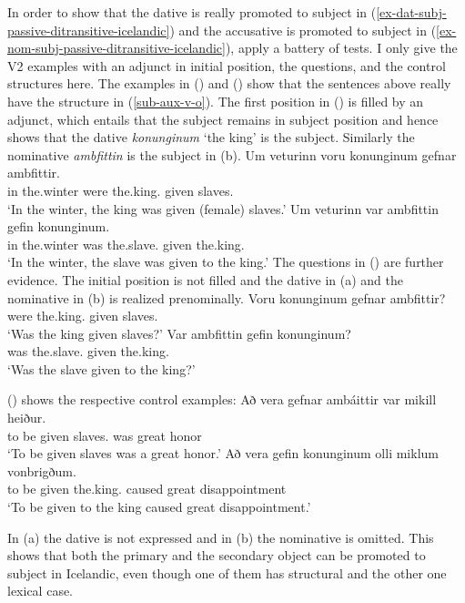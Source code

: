 In order to show that the dative is really promoted to subject in (\ref{ex-dat-subj-passive-ditransitive-icelandic}) and the accusative is
promoted to subject in (\ref{ex-nom-subj-passive-ditransitive-icelandic}), \citet*[]{ZMT85a} apply a battery of tests. I only give the
V2 examples with an adjunct in initial position, the questions, and the control structures here. The
examples in () and () show that the
sentences above really have the structure in (\ref{sub-aux-v-o}). The first position in () is
filled by an adjunct, which entails that the subject remains in subject position and hence shows
that the dative \emph{konunginum} `the king' is the subject. Similarly the nominative
\emph{ambfittin} is the subject in (b).
\eal
\ex
\gll Um veturinn voru konunginum gefnar ambfittir.\\
     in the.winter were the.king.\DAT{} given slaves.\NOM\\
\glt `In the winter, the king was given (female) slaves.'
\ex
\gll Um veturinn var ambfittin gefin konunginum.\\
     in the.winter was the.slave.\NOM{} given the.king.\NOM\\
\glt `In the winter, the slave was given to the king.'
\zl
The questions in () are further evidence. The initial position is not filled and the dative
in (a) and the nominative in (b) is realized prenominally.
\eal
\ex\label{ex-were-the-king-given-the-slaves}
\gll Voru konunginum gefnar ambfittir?\\
     were the.king.\DAT{} given slaves.\NOM{}\\
\glt `Was the king given slaves?'
\ex\label{ex-were-the-slaves-given-the-king}
\gll Var ambfittin gefin konunginum?\\
     was the.slave.\NOM{} given the.king.\DAT\\
\glt `Was the slave given to the king?'
\zl

() shows the respective control examples:
\eal
\ex
\gll Að vera gefnar ambáittir var mikill heiður.\\
     to be given slaves.\NOM{} was great honor\\
\glt `To be given slaves was a great honor.'
\ex
\gll Að vera gefin konunginum olli miklum vonbrigðum.\\
     to be given the.king.\DAT{} caused great disappointment\\
\glt `To be given to the king caused great disappointment.'

\zl
In (a) the dative is not expressed and in (b) the nominative is omitted. This shows
that both the primary and the secondary object can be promoted to subject in Icelandic, even though
one of them has structural and the other one lexical case.


